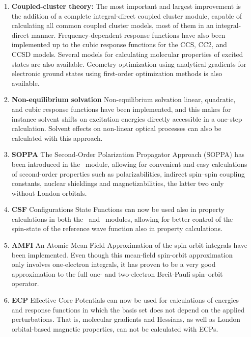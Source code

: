 \begin{enumerate}
\item {\bf Coupled-cluster theory:} The most important and largest
improvement is the addition of
a complete integral-direct coupled cluster module, capable of
calculating all common coupled cluster models, most of them in an
integral-direct manner. Frequency-dependent response functions have
also been implemented up to the cubic response functions for the CCS,
CC2, and CCSD models. Several models for calculating molecular
properties of excited states are also available. Geometry optimization
using analytical gradients for electronic ground states using
first-order optimization methods is also available.

\item {\bf Non-equilibrium solvation} Non-equilibrium
solvation linear, quadratic, and cubic response functions have been
implemented, and this
makes for instance solvent shifts on excitation energies directly
accessible in a one-step calculation. Solvent effects on non-linear
optical processes can also be calculated with this approach.

\item {\bf SOPPA} The Second-Order Polarization Propagator Approach (SOPPA) has
been introduced in the \aba\ module, allowing for convenient and easy
calculations of second-order properties such as polarizabilities,
indirect spin--spin coupling constants, nuclear shieldings and
magnetizabilities, the latter two only without London orbitals.

\item {\bf CSF} Configurations State Functions can now be used also in
property calculations in both the \resp\ and \aba\ modules, allowing
for better control of the spin-state of the reference wave function
also in property calculations.

\item {\bf AMFI} An Atomic Mean-Field Approximation of the spin-orbit
integrals have been implemented. Even though this mean-field
spin-orbit approximation only involves one-electron integrals, it has
proven to be a very good approximation to the full one- and
two-electron Breit-Pauli spin--orbit operator.

\item {\bf ECP} Effective Core Potentials can now be used for calculations
of energies and response functions in which the basis set does not
depend on the applied perturbations. That is, molecular gradients and
Hessians, as well as London orbital-based magnetic properties, can not
be calculated with ECPs.


\end{enumerate}

